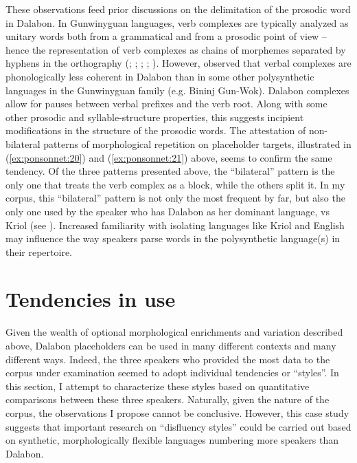 \documentclass[output=paper]{langscibook}
\begin{document}
These observations feed prior discussions on the delimitation of the prosodic word in Dalabon. In Gunwinyguan languages, verb complexes are typically analyzed as unitary words both from a grammatical and from a prosodic point of view – hence the representation of verb complexes as chains of morphemes separated by hyphens in the orthography (\citealt{McKay1975}; \citealt{Saulwick2003}; \citealt{Evans2003bininjgunwok}; \citealt{Baker2008}; \citealt{Kapitonov2021}). However, \citet{EvansEvans2008} observed that verbal complexes are phonologically less coherent in Dalabon than in some other polysynthetic languages in the Gunwinyguan family (e.g. Bininj Gun-Wok). Dalabon complexes allow for pauses between verbal prefixes and the verb root. Along with some other prosodic and syllable-structure properties, this suggests incipient modifications in the structure of the prosodic words. The attestation of non-bilateral patterns of morphological repetition on placeholder targets, illustrated in (\ref{ex:ponsonnet:20}) and (\ref{ex:ponsonnet:21}) above, seems to confirm the same tendency. Of the three patterns presented above, the “bilateral” pattern is the only one that treats the verb complex as a block, while the others split it. In my corpus, this “bilateral” pattern is not only the most frequent by far, but also the only one used by the speaker who has Dalabon as her dominant language, vs Kriol (see ). Increased familiarity with isolating languages like Kriol and English may influence the way speakers parse words in the polysynthetic language(s) in their repertoire. 

\section{Tendencies in use}
\label{sec:ponsonnet:4}
Given the wealth of optional morphological enrichments and variation described above, Dalabon placeholders can be used in many different contexts and many different ways. Indeed, the three speakers who provided the most data to the corpus under examination seemed to adopt individual tendencies or “styles”. In this section, I attempt to characterize these styles based on quantitative comparisons between these three speakers. Naturally, given the nature of the corpus, the observations I propose cannot be conclusive. However, this case study suggests that important research on “disfluency styles” could be carried out based on synthetic, morphologically flexible languages numbering more speakers than Dalabon. 
\end{document}
